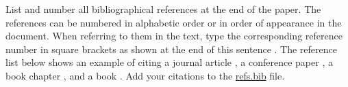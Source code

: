 \documentclass[smallabstract,smallcaptions]{dccpaper}
\begin{document}

List and number all bibliographical references at the end of the
paper. The references can be numbered in alphabetic order or in
order of appearance in the document. When referring to them in
the text, type the corresponding reference number in square
brackets as shown at the end of this sentence \cite{Fow2009}.
The reference list below shows an example of citing a
journal article \cite{Fow2009}, a conference paper \cite{Fow2008},
a book chapter \cite{FD2011}, and a book \cite{Par1998}.
Add your citations to the \url{refs.bib} file.



\end{document}
